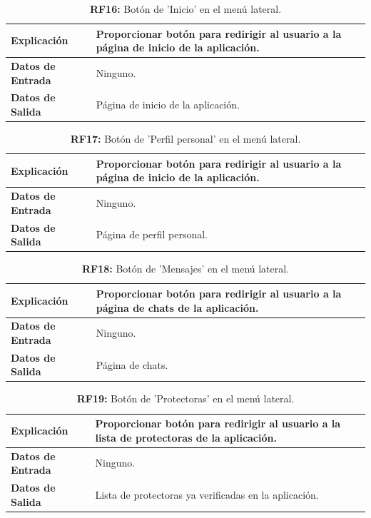 \documentclass[a4paper, 12pt]{article}
\begin{document}
\begin{table}[H]
\captionsetup{justification=raggedright,singlelinecheck=false}
\caption{\textbf{RF16:} Botón de 'Inicio' en el menú lateral.}
\label{tab:RF16}
	\begin{tabular}{|m{5cm}|m{10cm}|}
	\hline
	\textbf{Explicación} & Proporcionar botón para redirigir al usuario a la página de inicio de la aplicación. \\ 
	\hline
	\textbf{Datos de Entrada} &  Ninguno. \\ 
	\hline
	\textbf{Datos de Salida} &  Página de inicio de la aplicación. \\ 
	\hline
\end{tabular}
\end{table}

\begin{table}[H]
\captionsetup{justification=raggedright,singlelinecheck=false}
\caption{\textbf{RF17:} Botón de 'Perfil personal' en el menú lateral.}
\label{tab:RF17}
	\begin{tabular}{|m{5cm}|m{10cm}|}
	\hline
	\textbf{Explicación} & Proporcionar botón para redirigir al usuario a la página de inicio de la aplicación. \\ 
	\hline
	\textbf{Datos de Entrada} &  Ninguno. \\ 
	\hline
	\textbf{Datos de Salida} &  Página de perfil personal. \\ 
	\hline
\end{tabular}
\end{table}

\begin{table}[H]
\captionsetup{justification=raggedright,singlelinecheck=false}
\caption{\textbf{RF18:} Botón de 'Mensajes' en el menú lateral.}
\label{tab:RF18}
	\begin{tabular}{|m{5cm}|m{10cm}|}
	\hline
	\textbf{Explicación} & Proporcionar botón para redirigir al usuario a la página de chats de la aplicación. \\ 
	\hline
	\textbf{Datos de Entrada} &  Ninguno. \\ 
	\hline
	\textbf{Datos de Salida} &  Página de chats. \\ 
	\hline
\end{tabular}
\end{table}

\begin{table}[H]
\captionsetup{justification=raggedright,singlelinecheck=false}
\caption{\textbf{RF19:} Botón de 'Protectoras' en el menú lateral.}
\label{tab:RF19}
	\begin{tabular}{|m{5cm}|m{10cm}|}
	\hline
	\textbf{Explicación} & Proporcionar botón para redirigir al usuario a la lista de protectoras de la aplicación. \\ 
	\hline
	\textbf{Datos de Entrada} &  Ninguno. \\ 
	\hline
	\textbf{Datos de Salida} &  Lista de protectoras ya verificadas en la aplicación. \\ 
	\hline
\end{tabular}
\end{table}
\end{document}
